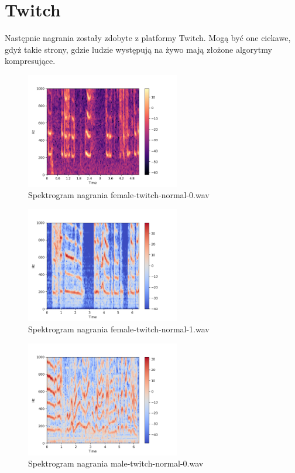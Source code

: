 \documentclass[a4paper,12pt]{extarticle}
\begin{document}
\section*{Twitch}

Następnie nagrania zostały zdobyte z platformy Twitch. Mogą być one ciekawe, gdyż takie strony, gdzie ludzie występują na żywo mają złożone algorytmy kompresujące.

\begin{figure}[h]
\centering
\includegraphics[width=0.6\textwidth]{twitch-0}
\caption{Spektrogram nagrania female-twitch-normal-0.wav}
\end{figure}

\begin{figure}[h]
\centering
\includegraphics[width=0.6\textwidth]{twitch-1}
\caption{Spektrogram nagrania female-twitch-normal-1.wav}
\end{figure}

\begin{figure}[h]
\centering
\includegraphics[width=0.6\textwidth]{twitch-2}
\caption{Spektrogram nagrania male-twitch-normal-0.wav}
\end{figure}
\end{document}
